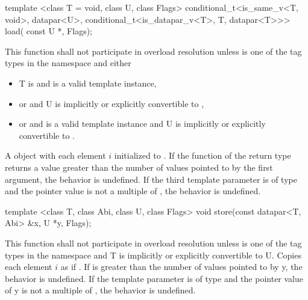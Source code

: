 \begin{itemdecl}
template <class T = void, class U, class Flags>
conditional_t<is_same_v<T, void>, datapar<U>, conditional_t<is_datapar_v<T>, T, datapar<T>>> load(
    const U *, Flags);
\end{itemdecl}
\begin{itemdescr}
  \pnum\remarks This function shall not participate in overload resolution unless  is one of the tag types in the  namespace and either
  \begin{itemize}
    \item \type T is \void and \datapar[<U>] is a valid template instance,
    \item or  and \type U is implicitly or explicitly convertible to ,
    \item or  and \datapar[<T>] is a valid template instance and \type U is implicitly or explicitly convertible to .
  \end{itemize}
  \pnum\returns A \datapar object with each element $i$ initialized to  \foralli.
  \pnum\remarks If the  function of the return type returns a value greater than the number of values pointed to by the first argument, the behavior is undefined.
  \pnum\remarks If the third template parameter is of type  and the pointer value is not a multiple of , the behavior is undefined.
\end{itemdescr}

\begin{itemdecl}
template <class T, class Abi, class U, class Flags>
void store(const datapar<T, Abi> &x, U *y, Flags);
\end{itemdecl}
\begin{itemdescr}
  \pnum\remarks This function shall not participate in overload resolution unless  is one of the tag types in the  namespace and \type T is implicitly or explicitly convertible to \type U.
  \pnum\effects Copies each element $i$ as if  \foralli.
  \pnum\remarks If \datapar[<T, Abi>] is greater than the number of values pointed to by \code y, the behavior is undefined.
  \pnum\remarks If the  template parameter is of type  and the pointer value of \code y is not a multiple of , the behavior is undefined.
\end{itemdescr}

